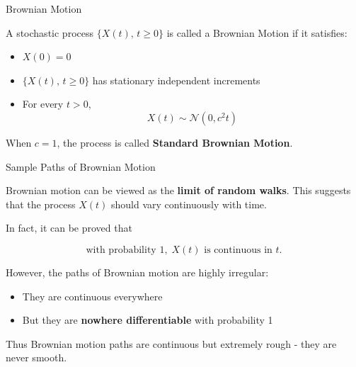 \documentclass{beamer}
\begin{document}
	\begin{frame}{Brownian Motion}
		
		A stochastic process $\{X(t),\, t \ge 0\}$ is called a 
		Brownian Motion if it satisfies:
		
		\begin{itemize}[<+->]
			\item $X(0) = 0$
			\item $\{X(t),\, t \ge 0\}$ has stationary independent increments
			\item For every $t > 0$, 
			\[
			X(t) \sim \mathcal{N}(0, c^{2}t)
			\]
		\end{itemize}
		
		\pause
		
		When $c=1$, the process is called \textbf{Standard Brownian Motion}.
		
	\end{frame}
	
	\begin{frame}{Sample Paths of Brownian Motion}
		
		Brownian motion can be viewed as the \textbf{limit of random walks}.
		This suggests that the process $X(t)$ should vary continuously with time.
		
		\pause
		
		In fact, it can be proved that
		
		\[
		\text{with probability }1,\; X(t)\text{ is continuous in }t.
		\]
		
		\pause
		
		However, the paths of Brownian motion are highly irregular:
		
		\begin{itemize}
			\item They are continuous everywhere
			\item But they are \textbf{nowhere differentiable} with probability 1
		\end{itemize}
		
		\pause
		
		Thus Brownian motion paths are continuous but extremely rough
		- they are never smooth.
		
	\end{frame}
	
\end{document}
